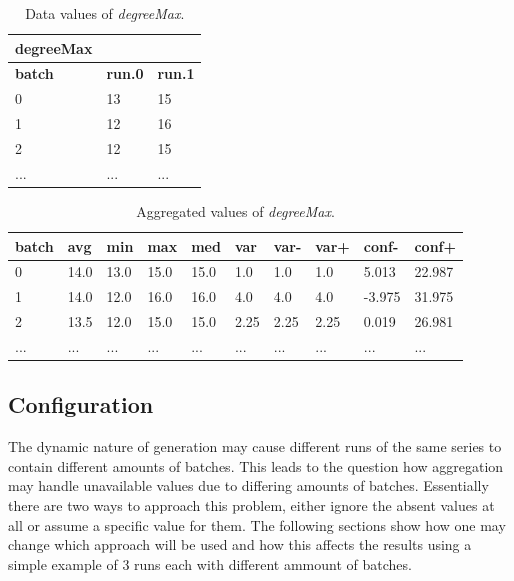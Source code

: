 \begin{table}[h]
\centering
\begin{tabular}[h]{|l|l|l|}\hline
	\textbf{degreeMax} & &\\
	\hline
	\textbf{batch} & \textbf{run.0} & \textbf{run.1}\\
	\hline
	0 & 13 & 15\\
	\hline
	1 & 12 & 16\\
	\hline
	2 & 12 & 15\\
	\hline
	... & ... & ... \\
	\hline
\end{tabular}
\caption{Data values of \textit{degreeMax}.}
\label{tab:degreemax-data}
\end{table}
\begin{table}[h]
\centering
\begin{tabular}[h]{|l|l|l|l|l|l|l|l|l|l|}\hline
	\textbf{batch} & \textbf{avg} & \textbf{min} & \textbf{max} & \textbf{med} & \textbf{var} & \textbf{var-} & \textbf{var+} & \textbf{conf-} & \textbf{conf+}\\
	\hline
	0 & 14.0 & 13.0 & 15.0 & 15.0 & 1.0 & 1.0 & 1.0 & 5.013 & 22.987\\
	\hline
	1 & 14.0 & 12.0 & 16.0 & 16.0 & 4.0 & 4.0 & 4.0 & -3.975 & 31.975\\
	\hline
	2 & 13.5 & 12.0 & 15.0 & 15.0 & 2.25 & 2.25 & 2.25 & 0.019 & 26.981\\
	\hline
	... & ... & ... & ... & ... & ... & ... & ... & ... & ...\\
	\hline
\end{tabular}
\caption{Aggregated values of \textit{degreeMax}.}
\label{tab:degreemax-aggr}
\end{table}

\subsection{Configuration}
The dynamic nature of generation may cause different runs of the same series to contain different amounts of batches. This leads to the question how aggregation may handle unavailable values due to differing amounts of batches. Essentially there are two ways to approach this problem, either ignore the absent values at all or assume a specific value for them. The following sections show how one may change which approach will be used and how this affects the results using a simple example of 3 runs each with different ammount of batches.

